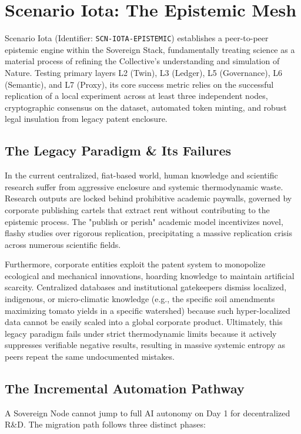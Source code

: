 \chapter{Scenario Iota: The Epistemic Mesh}
\label{ch:scenario_iota}

Scenario Iota (Identifier: \texttt{SCN-IOTA-EPISTEMIC}) establishes a peer-to-peer epistemic engine within the Sovereign Stack, fundamentally treating science as a material process of refining the Collective's understanding and simulation of Nature. Testing primary layers L2 (Twin), L3 (Ledger), L5 (Governance), L6 (Semantic), and L7 (Proxy), its core success metric relies on the successful replication of a local experiment across at least three independent nodes, cryptographic consensus on the dataset, automated token minting, and robust legal insulation from legacy patent enclosure.

\section{The Legacy Paradigm \& Its Failures}
In the current centralized, fiat-based world, human knowledge and scientific research suffer from aggressive enclosure and systemic thermodynamic waste. Research outputs are locked behind prohibitive academic paywalls, governed by corporate publishing cartels that extract rent without contributing to the epistemic process. The "publish or perish" academic model incentivizes novel, flashy studies over rigorous replication, precipitating a massive replication crisis across numerous scientific fields. 

Furthermore, corporate entities exploit the patent system to monopolize ecological and mechanical innovations, hoarding knowledge to maintain artificial scarcity. Centralized databases and institutional gatekeepers dismiss localized, indigenous, or micro-climatic knowledge (e.g., the specific soil amendments maximizing tomato yields in a specific watershed) because such hyper-localized data cannot be easily scaled into a global corporate product. Ultimately, this legacy paradigm fails under strict thermodynamic limits because it actively suppresses verifiable negative results, resulting in massive systemic entropy as peers repeat the same undocumented mistakes.

\section{The Incremental Automation Pathway}
A Sovereign Node cannot jump to full AI autonomy on Day 1 for decentralized R\&D. The migration path follows three distinct phases:

